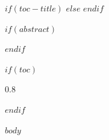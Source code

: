 \documentclass[10pt]{article}
\newcommand{\styledtoc}{%
  {\hypersetup{linkcolor=AccentPrimary}%
   \setcounter{tocdepth}{2}%
   \setlength{\parskip}{0pt}%
   \begin{spacing}{0.8}\tableofcontents\end{spacing}%
   \vspace{1em}}%
  \newpage}
\begin{document}
$if(toc-title)$
  \renewcommand{\contentsname}{\color{AccentPrimary}\Large $toc-title$}
$else$
  \renewcommand{\contentsname}{\color{AccentPrimary}\Large Contents}
$endif$

$if(abstract)$
\begin{abstract}
$abstract$
\end{abstract}
\vspace{1em}
$endif$

\setcounter{secnumdepth}{0}

$if(toc)$
\styledtoc
$endif$

$body$
\end{document}

